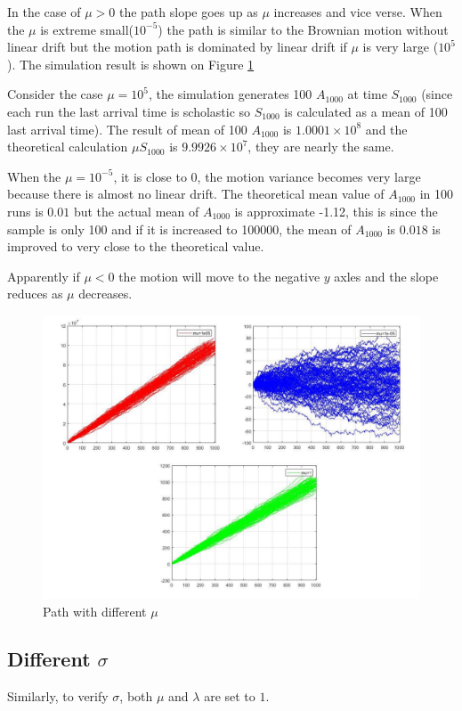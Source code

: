 In the case of $\mu>0$ the path slope goes up as $\mu$ increases and vice verse. When the $\mu$ is extreme small($10^{-5}$) the path is similar to the Brownian motion without linear drift but the motion path is dominated by linear drift if $\mu$ is very large ($10^{5}$). The simulation result is shown on Figure \ref{fig:diffmu}

Consider the case $\mu=10^{5}$, the simulation generates 100 $A_{1000}$ at time $S_{1000}$ (since each run the last arrival time is scholastic so $S_{1000}$ is calculated as a mean of 100 last arrival time). The result of mean of 100 $A_{1000}$ is $1.0001\times 10^8$ and the theoretical calculation $\mu S_{1000}$ is $9.9926\times 10^7$, they are nearly the same.

When the $\mu=10^{-5}$, it is close to 0, the motion variance becomes very large because there is almost no linear drift. The theoretical mean value of $A_{1000}$ in 100 runs is $0.01$ but the actual mean of $A_{1000}$ is approximate -1.12, this is since the sample is only 100 and if it is increased to 100000, the mean of $A_{1000}$ is $0.018$ is improved to very close to the theoretical value.

Apparently if $\mu<0$ the motion will move to the negative $y$ axles and the slope reduces as $\mu$ decreases.  

\begin{figure}[H]
    \centering
    \includegraphics[scale=0.65]{figures/Task3/Diff_mu.pdf}
    \caption{Path with different $\mu$}
    \label{fig:diffmu}
\end{figure}

\subsection{Different $\sigma$}
Similarly, to verify $\sigma$, both $\mu$ and $\lambda$ are set to $1$.

